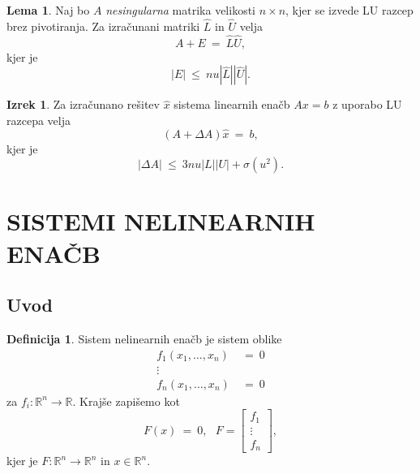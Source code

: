 \documentclass[11pt]{article}
\theoremstyle{definition}
\newtheorem{definicija}{Definicija}[section]
\newtheorem{lema}{Lema}
\newtheorem{izrek}{Izrek}
\begin{document}
\begin{lema}

Naj bo $A$ \textit{nesingularna} matrika velikosti $n \times n$, kjer se izvede LU razcep brez pivotiranja. Za izračunani matriki $\hat{L}$ in $\hat{U}$ velja
$$A + E ~=~ \hat{L} \hat{U},$$
kjer je 
$$|E| ~\leq~ n u |\hat{L}| |\hat{U}|.$$

\end{lema}
\vspace{0.5cm}

\begin{izrek}

Za izračunano rešitev $\hat{x}$ sistema linearnih enačb $Ax = b$ z uporabo LU razcepa velja 
$$(A + \Delta A) \hat{x} ~=~ b,$$
kjer je 
$$|\Delta A| ~\leq~ 3 n u |L| |U| + \sigma(u^2).$$

\end{izrek}
\vspace{0.5cm}


\pagebreak


\section{SISTEMI NELINEARNIH ENAČB}
\vspace{0.5cm}


\subsection{Uvod}
\vspace{0.5cm}

\begin{definicija}

Sistem nelinearnih enačb je sistem oblike
\begin{align*}
f_1(x_1, \ldots, x_n) ~&=~ 0 \\
\vdots \\
f_n(x_1, \ldots, x_n) ~&=~ 0
\end{align*}
za $f_i: \mathbb{R}^n \rightarrow \mathbb{R}$. Krajše zapišemo kot
$$F(x) ~=~ 0, ~~~F = \begin{bmatrix}
f_1 \\
\vdots \\
f_n
\end{bmatrix},$$
kjer je $F: \mathbb{R}^n \rightarrow \mathbb{R}^n$ in $x \in \mathbb{R}^n$.

\end{definicija}
\vspace{0.5cm}
\end{document}
